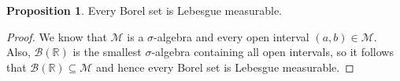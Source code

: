 \documentclass[a4paper,11pt]{article}
\theoremstyle{plain}
\newtheorem{theorem}{Theorem}[section]
\theoremstyle{definition}
\newtheorem{proposition}[theorem]{Proposition}
\begin{document}

\begin{proposition}
Every Borel set is Lebesgue measurable.
\end{proposition}

\begin{proof} \citep[p.~42]{MC}
We know that $\mathcal{M}$ is a $\sigma$-algebra and every open interval $(a,b) \in \mathcal{M}$. Also, $\mathcal{B}(\mathbb{R})$ is the smallest $\sigma$-algebra containing all open intervals, so it follows that $\mathcal{B}(\mathbb{R}) \subseteq \mathcal{M}$ and hence every Borel set is Lebesgue measurable.
\end{proof}
\end{document}

